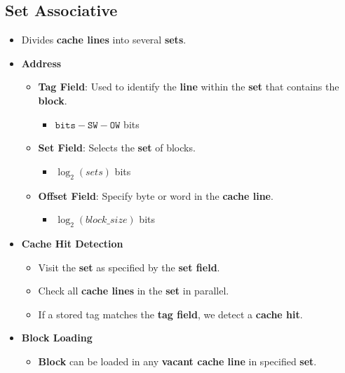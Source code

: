 \documentclass[12pt, letterpaper]{article}
\begin{document}
\subsection*{Set Associative}

\begin{itemize}
  \item Divides \textbf{cache lines} into several \textbf{sets}.
  \item \textbf{Address}
    \begin{itemize}
      \item \textbf{Tag Field}:  Used to identify the \textbf{line}
        within the \textbf{set} that contains the \textbf{block}.
        \begin{itemize}
          \item $ \texttt{bits} - \texttt{SW} - \texttt{OW} $ bits
        \end{itemize}
      \item \textbf{Set Field}: Selects the \textbf{set} of blocks.
        \begin{itemize}
          \item $ \log_2 (sets) $ bits
        \end{itemize}
      \item \textbf{Offset Field}: Specify byte or word in the
        \textbf{cache line}.
        \begin{itemize}
          \item $ \log_2 (block\_size) $ bits
        \end{itemize}
    \end{itemize}
  \item \textbf{Cache Hit Detection}
    \begin{itemize}
      \item Visit the \textbf{set} as specified by the \textbf{set field}.
      \item Check all \textbf{cache lines} in the \textbf{set} in parallel.
      \item If a stored tag matches the \textbf{tag field}, we detect
        a \textbf{cache hit}.
    \end{itemize}
  \item \textbf{Block Loading}
    \begin{itemize}
      \item \textbf{Block} can be loaded in any \textbf{vacant cache
        line} in specified \textbf{set}.
    \end{itemize}
\end{itemize}
\end{document}
